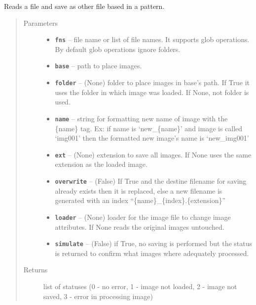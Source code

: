 \documentclass[letterpaper,10pt,english]{sphinxmanual}
\begin{document}

\begin{fulllineitems}
\label{RRtoolbox.lib:RRtoolbox.lib.image.convertAs}
Reads a file and save as other file based in a pattern.
\begin{quote}\begin{description}
\item[{Parameters}] \leavevmode\begin{itemize}
\item {} 
\textbf{\texttt{fns}} -- file name or list of file names. It supports glob operations.
By default glob operations ignore folders.

\item {} 
\textbf{\texttt{base}} -- path to place images.

\item {} 
\textbf{\texttt{folder}} -- (None) folder to place images in base's path.
If True it uses the folder in which image was loaded.
If None, not folder is used.

\item {} 
\textbf{\texttt{name}} -- string for formatting new name of image with the \{name\} tag.
Ex: if name is `new\_\{name\}' and image is called `img001' then the
formatted new image's name is `new\_img001'

\item {} 
\textbf{\texttt{ext}} -- (None) extension to save all images. If None uses the same extension
as the loaded image.

\item {} 
\textbf{\texttt{overwrite}} -- (False) If True and the destine filename for saving already
exists then it is replaced, else a new filename is generated
with an index ``\{name\}\_\{index\}.\{extension\}''

\item {} 
\textbf{\texttt{loader}} -- (None) loader for the image file to change image attributes.
If None reads the original images untouched.

\item {} 
\textbf{\texttt{simulate}} -- (False) if True, no saving is performed but the status is returned
to confirm what images where adequately processed.

\end{itemize}

\item[{Returns}] \leavevmode
list of statuses (0 - no error, 1 - image not loaded,
2 - image not saved, 3 - error in processing image)

\end{description}\end{quote}

\end{fulllineitems}
\end{document}
